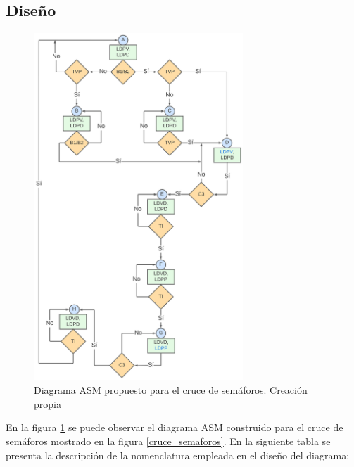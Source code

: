 \newpage

\subsection{Diseño}

\begin{figure}[H]
    \centering
    \includegraphics[width=0.7\textwidth]{images/diagrama_asm.png}
    \caption{Diagrama ASM propuesto para el cruce de semáforos. Creación propia}
    \label{diagrama_asm}
\end{figure}

En la figura \ref{diagrama_asm} se puede observar el diagrama ASM construido para el cruce de semáforos mostrado en la figura \ref{cruce_semaforos}. En la siguiente tabla se presenta la descripción de la nomenclatura empleada en el diseño del diagrama: 

